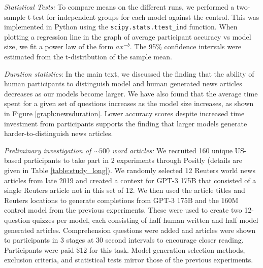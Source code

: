 

\textit{Statistical Tests:} To compare means on the different runs, we performed a two-sample t-test for independent groups for each model against the control. This was implemented in Python using the \verb|scipy.stats.ttest_ind| function. When plotting a regression line in the graph of average participant accuracy vs model size, we fit a power law of the form $ax^{-b}$. The 95\% confidence intervals were estimated from the t-distribution of the sample mean.



\textit{Duration statistics}: In the main text, we discussed the finding that the ability of human participants to distinguish model and human generated news articles decreases as our models become larger. We have also found that the average time spent for a given set of questions increases as the model size increases, as shown in Figure \ref{graph:newsduration}. Lower accuracy scores despite increased time investment from participants supports the finding that larger models generate harder-to-distinguish news articles.

\textit{Preliminary investigation of $\sim500$ word articles:} We recruited 160 unique US-based participants to take part in 2 experiments through Positly (details are given in Table \ref{table:study_long}). We randomly selected 12 Reuters world news articles from late 2019 and created a context for GPT-3 175B that consisted of a single Reuters article not in this set of 12. We then used the article titles and Reuters locations to generate completions from GPT-3 175B and the 160M control model from the previous experiments. These were used to create two 12-question quizzes per model, each consisting of half human written and half model generated articles. Comprehension questions were added and articles were shown to participants in 3 stages at 30 second intervals to encourage closer reading. Participants were paid \$12 for this task. Model generation selection methods, exclusion criteria, and statistical tests mirror those of the previous experiments.

